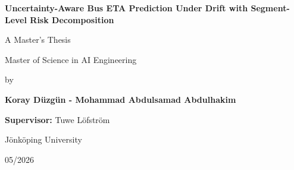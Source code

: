 \documentclass[12pt, a4paper, oneside]{report}
\newcommand{\thesistitle}{Uncertainty-Aware Bus ETA Prediction Under Drift with Segment-Level Risk Decomposition}
\newcommand{\thesisauthor}{Koray Düzgün - Mohammad Abdulsamad Abdulhakim}
\newcommand{\supervisor}{Tuwe Löfström}
\newcommand{\university}{Jönköping University}
\newcommand{\submissiondate}{05/2026}
\begin{document}
\begin{titlepage}
    \centering
    \vspace*{2cm}

    {\Huge \bfseries \thesistitle \par}
    \vspace{2cm}

    {\Large A Master's Thesis \par}
    \vspace{0.5cm}
    {\Large Master of Science in AI Engineering \par}

    \vspace{2cm}

    {\large by \par}
    \vspace{0.3cm}
    {\Large \bfseries \thesisauthor \par}
    \vfill

    \begin{flushleft}
        \textbf{Supervisor:} \supervisor \\
    \end{flushleft}

    \vfill

    {\large \department \par}
    {\large \faculty \par}
    {\large \university \par}
    \vspace{0.5cm}
    {\large \submissiondate \par}

\end{titlepage}



\end{document}

